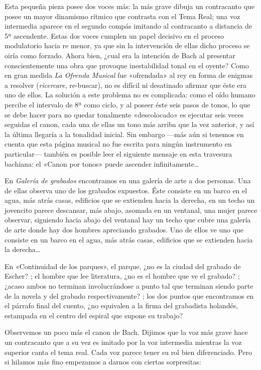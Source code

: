 Esta pequeña pieza posee dos voces más: la más grave dibuja un contracanto que posee un mayor dinamismo rítmico que contrasta con el Tema Real; una voz intermedia aparece en el segundo compás imitando al contracanto a distancia de 5ª ascendente. Estas dos voces cumplen un papel decisivo en el proceso modulatorio hacia re menor, ya que sin la intervención de ellas dicho proceso se oiría como forzado. Ahora bien, ¿cual era la intención de Bach al presentar conscientemente una obra que provoque inestabilidad tonal en el oyente? Como en gran medida \emph{La Ofrenda Musical} fue «ofrendada» al rey en forma de enigmas a resolver (\emph{ricercare}, re-buscar), no es difícil ni desatinado afirmar que éste era uno de ellos. La solución a este problema no es complicada: como el oído humano percibe el intervalo de 8ª como ciclo, y al poseer éste seis pasos de tonos, lo que se debe hacer para no quedar tonalmente «descolocado» es ejecutar seis veces seguidas el canon, cada una de ellas un tono más arriba que la vez anterior, y así la última llegaría a la tonalidad inicial. Sin embargo ---más aún si tenemos en cuenta que esta página musical no fue escrita para ningún instrumento en particular--- también es posible leer el siguiente mensaje en esta travesura bachiana: el «Canon por tonos» puede ascender infinitamente\ldots

En \emph{Galería de grabados} encontramos en una galería de arte a dos personas. Una de ellas observa uno de los grabados expuestos. Éste consiste en un barco en el agua, más atrás casas, edificios que se extienden hacia la derecha, en un techo un jovencito parece descansar, más abajo, asomada en un ventanal, una mujer parece observar, siguiendo hacia abajo del ventanal hay un techo que cubre una galería de arte donde hay dos hombres apreciando grabados. Uno de ellos ve uno que consiste en un barco en el agua, más atrás casas, edificios que se extienden hacia la derecha\ldots

En «Continuidad de los parques», el parque, ¿no es la ciudad del grabado de Escher? ; el hombre que lee literatura, ¿no es el hombre que ve el grabado? ; ¿acaso ambos no terminan involucrándose a punto tal que terminan siendo parte de la novela y del grabado respectivamente? ; los dos puntos que encontramos en el párrafo final del cuento, ¿no equivalen a la firma del grabadista holandés, estampada en el centro del espiral que supone su trabajo?

Observemos un poco más el canon de Bach. Dijimos que la voz más grave hace un contracanto que a su vez es imitado por la voz intermedia mientras la voz superior canta el tema real. Cada voz parece tener su rol bien diferenciado. Pero si hilamos más fino empezamos a darnos con ciertas sorpresitas:

